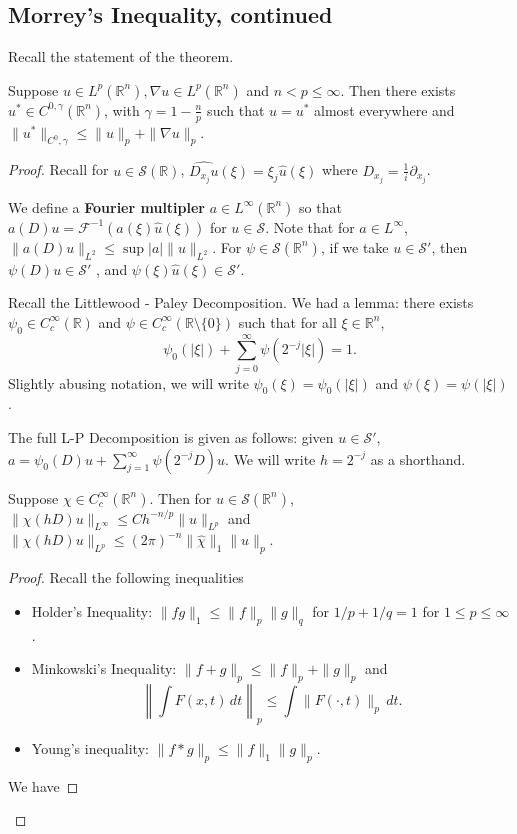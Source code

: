 \documentclass[12pt]{scrartcl}
\newcommand{\R}{\mathbb{R}}
\renewcommand{\hat}{\widehat}
\newcommand{\<}{\langle}
\renewcommand{\>}{\rangle}
\let \mc \mathcal
\let \grad \nabla
\begin{document}
\subsection{Morrey's Inequality, continued}
Recall the statement of the theorem.
\begin{thm}  Suppose $u \in L^p(\R^n), \grad u \in L^p(\R^n)$ and $n < p \le \infty$.  Then there exists $u^* \in C^{0, \gamma}(\R^n)$, with $\gamma = 1 - \frac{n}{p}$ such that $u = u^*$ almost everywhere and $\|u^*\|_{C^0, \gamma} \le \|u\|_p + \|\grad u\|_{p}$.
\end{thm}
\begin{proof}
Recall for $u \in \mc S(\R)$, $\hat{D_{x_j} u}(\xi) = \xi_j \hat{u}(\xi)$ where $D_{x_j} = \frac{1}{i} \partial_{x_j}$.  

We define a \textbf{Fourier multipler} $a \in L^\infty(\R^n)$ so that $a(D)u = \mc{F}^{-1}(a(\xi) \hat{u}(\xi))$ for $u \in \mc S$.   Note that for $a \in L^\infty$, $\|a(D)u\|_{L^2} \le \sup |a| \|u\|_{L^2}$.  For $\psi \in \mc S(\R^n)$, if we take $u \in \mc S'$, then $\psi(D) u \in \mc S'$ , and $\psi(\xi) \hat{u}(\xi) \in \mc S'$.

Recall the Littlewood - Paley Decomposition. We had a lemma: there exists $\psi_0 \in C_c^\infty(\R)$ and $\psi \in C_c^\infty(\R \setminus \{0\})$ such that for all $\xi \in \R^n$, 
$$\psi_0(|\xi|) + \sum_{j=0}^\infty \psi(2^{-j} |\xi|) = 1.$$ 
Slightly abusing notation, we will write $\psi_0(\xi) = \psi_0(|\xi|)$ and $\psi(\xi) = \psi(|\xi|)$.  

The full L-P Decomposition is given as follows: given $u \in \mc S'$, $a = \psi_0(D) u + \sum_{j=1}^\infty \psi(2^{-j }D) u$.  We will write $h = 2^{-j}$ as a shorthand.
\begin{lemma} Suppose $\chi \in C_c^\infty(\R^n)$.  Then for $u \in \mc S(\R^n)$, $\|\chi(hD)u\|_{L^\infty} \le C h^{-n/p} \|u\|_{L^p}$ 
and $\|\chi(hD) u\|_{L^p} \le (2\pi)^{-n} \|\hat{\chi}\|_1 \|u\|_p$.
\end{lemma}
\begin{proof}


Recall the following inequalities
\begin{itemize}
\item Holder's Inequality: $\|fg\|_1 \le \|f\|_p\|g\|_q$ for $1/p + 1/q = 1$ for $1 \le p \le \infty$.  
\item Minkowski's Inequality: $\|f+g\|_p \le \|f\|_p + \|g\|_p$ and 
$$\left \|\int F(x, t)\,dt \right \|_p \le \int \|F(\cdot, t)\|_p \,dt.$$
\item Young's inequality: $\|f * g\|_p \le \|f\|_1 \|g\|_p$.
\end{itemize}
We have 


\end{proof}
\end{proof}
\end{document}
